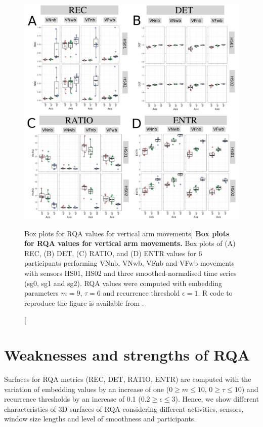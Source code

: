 \begin{figure}
\centering
\includegraphics[width=1.0\textwidth]{BP-rqa-v}
	\caption
	[Box plots for RQA values for vertical arm movements]{
	{\bf Box plots for RQA values for vertical arm movements.} 
 	Box plots of (A) REC, (B) DET, (C) RATIO, and (D) ENTR values 
	for 6 participants performing VNnb, VNwb, VFnb and VFwb movements
	with sensors HS01, HS02 and three smoothed-normalised  
	time series (sg0, sg1 and sg2).
	RQA values were computed with 
	embedding parameters $m=9$, $\tau=6$ and recurrence threshold
	$\epsilon=1$.
	R code to reproduce the figure is available from \cite{hwum2018}.
        }
    \label{fig:BPRQAV}
\end{figure}
%






\newpage
\section{Weaknesses and strengths of RQA} \label{wsRQAhii}
Surfaces for RQA metrics (REC, DET, RATIO, ENTR) are computed with the 
variation of embedding values by an increase of one 
($0 \ge m \le 10$, $0 \ge \tau \le 10$) 
and recurrence thresholds by an increase of 0.1 ($0.2 \ge \epsilon \le 3$).
Hence, we show different characteristics of 3D surfaces of RQA considering 
different activities, sensors, window size lengths and level of smoothness 
and participants.

